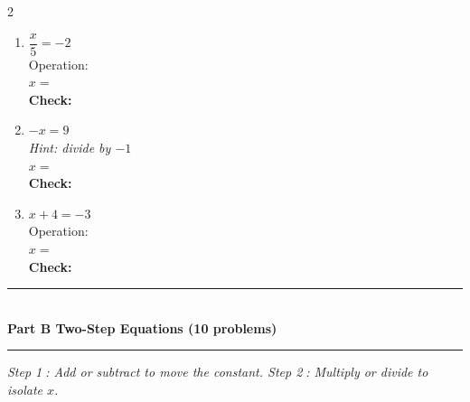 \documentclass[12pt]{article}
\newcommand{\wspm}{\vspace{2.0cm}}
\newcommand{\sblank}{\underline{\hspace{1.4cm}}}
\newcommand{\sectionbar}[1]{%
  \vspace{8pt}
  \noindent\rule{\textwidth}{0.8pt}\\[2pt]
  {\large\bfseries #1}\\[-4pt]
  \rule{\textwidth}{0.8pt}
  \vspace{4pt}
}
\begin{document}
\begin{multicols}{2}
\begin{enumerate}[label=\textbf{\arabic*.}, itemsep=0pt]
  \item $\dfrac{x}{5} = -2$\\[8pt]
  Operation: \sblank\\[4pt]
  $x = $ \sblank\\[4pt]
  \textbf{Check:} \underline{\hspace{3.5cm}}
  \wspm

  \item $-x = 9$\\[4pt]
  \textit{Hint: divide by $-1$}\\[4pt]
  $x = $ \sblank\\[4pt]
  \textbf{Check:} \underline{\hspace{3.5cm}}
  \wspm

  \item $x + 4 = -3$\\[4pt]
  Operation: \sblank\\[4pt]
  $x = $ \sblank\\[4pt]
  \textbf{Check:} \underline{\hspace{3.5cm}}
  \wspm

\end{enumerate}
\end{multicols}

\newpage

\sectionbar{Part B \quad Two-Step Equations \hfill{\normalfont\normalsize (10 problems)}}

\noindent\textit{%
Step \textcircled{1}: Add or subtract to move the constant.
\quad Step \textcircled{2}: Multiply or divide to isolate $x$.}
\end{document}
